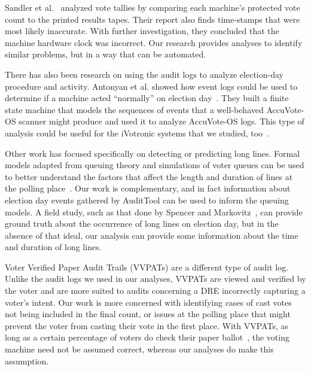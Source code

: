 \documentclass[letterpaper,twocolumn,10pt]{article}
\begin{document}
Sandler et al.~\cite{Sandler2007} analyzed vote tallies by comparing each
machine’s protected vote count to the printed results tapes. Their report also
finds time-stamps that were most likely inaccurate. With further investigation,
they concluded that the machine hardware clock was incorrect. Our research
provides analyses to identify similar problems, but in a way that can be
automated.   

There has also been research on using the audit logs to analyze election-day
procedure and activity. Antonyan et al. showed how event logs could be used to
determine if a machine acted ``normally'' on election
day~\cite{Antonyan2009}. They built a finite state machine that models the
sequences of events that a well-behaved AccuVote-OS scanner might produce and
used it to analyze AccuVote-OS logs. This type of analysis could be useful for
the iVotronic systems that we studied, too~\cite{Mascher2010}.  

Other work has focused specifically on detecting or predicting long
lines. Formal models adapted from queuing theory and simulations of voter queues
can be used to better understand the factors that affect the length and duration
of lines at the polling place~\cite{Allen2006, Edel2010}. Our work is
complementary, and in fact information about election day events gathered by
AuditTool can be used to inform the queuing models. A field study, such as that
done by Spencer and Markovitz~\cite{Spencer2010}, can provide ground truth about
the occurrence of long lines on election day, but in the absence of that ideal,
our analysis can provide some information about the time and duration of long
lines. 


Voter Verified Paper Audit Trails (VVPATs) are a different type of audit
log. Unlike the audit logs we used in our analyses, VVPATs are viewed and
verified by the voter and are more suited to audits concerning a DRE incorrectly
capturing a voter’s intent. Our work is more concerned with identifying cases of
cast votes not being included in the final count, or issues at the polling place
that might prevent the voter from casting their vote in the first place. With
VVPATs, as long as a certain percentage of voters do check their paper
ballot~\cite{Hall2006}, the voting machine need not be assumed correct, whereas
our analyses do make this assumption. 
\end{document}
